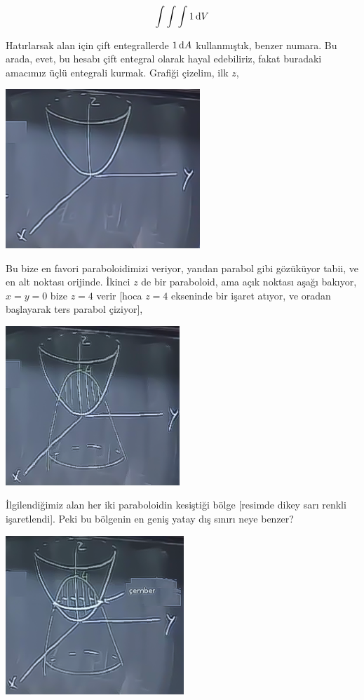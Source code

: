 \documentclass[12pt,fleqn]{article}\usepackage{../../common}
\begin{document}
$$ \int \int \int 1 \,\mathrm{d} V $$

Hatırlarsak alan için çift entegrallerde $1 \,\mathrm{d} A$ kullanmıştık, benzer
numara. Bu arada, evet, bu hesabı çift entegral olarak hayal edebiliriz,
fakat buradaki amacımız üçlü entegrali kurmak. Grafiği çizelim, ilk $z$,

\begin{center}
\includegraphics[height=6cm]{25_2.png}
\end{center}

Bu bize en favori paraboloidimizi veriyor, yandan parabol gibi gözüküyor
tabii, ve en alt noktası orijinde. İkinci $z$ de bir paraboloid, ama açık
noktası aşağı bakıyor, $x=y=0$ bize $z=4$ verir [hoca $z=4$ ekseninde bir
işaret atıyor, ve oradan başlayarak ters parabol çiziyor], 

\begin{center}
\includegraphics[height=6cm]{25_3.png}
\end{center}

İlgilendiğimiz alan her iki paraboloidin kesiştiği bölge [resimde dikey
sarı renkli işaretlendi]. Peki bu bölgenin en geniş yatay dış sınırı neye
benzer?

\begin{center}
\includegraphics[height=6cm]{25_4.png}
\end{center}
\end{document}
